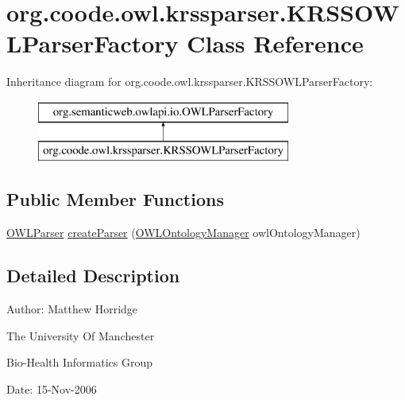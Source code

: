 \hypertarget{classorg_1_1coode_1_1owl_1_1krssparser_1_1_k_r_s_s_o_w_l_parser_factory}{\section{org.\-coode.\-owl.\-krssparser.\-K\-R\-S\-S\-O\-W\-L\-Parser\-Factory Class Reference}
\label{classorg_1_1coode_1_1owl_1_1krssparser_1_1_k_r_s_s_o_w_l_parser_factory}
}
Inheritance diagram for org.\-coode.\-owl.\-krssparser.\-K\-R\-S\-S\-O\-W\-L\-Parser\-Factory\-:\begin{figure}[H]
\begin{center}
\leavevmode
\includegraphics[height=2.000000cm]{classorg_1_1coode_1_1owl_1_1krssparser_1_1_k_r_s_s_o_w_l_parser_factory}
\end{center}
\end{figure}
\subsection*{Public Member Functions}
\begin{DoxyCompactItemize}
\item 
\hyperlink{interfaceorg_1_1semanticweb_1_1owlapi_1_1io_1_1_o_w_l_parser}{O\-W\-L\-Parser} \hyperlink{classorg_1_1coode_1_1owl_1_1krssparser_1_1_k_r_s_s_o_w_l_parser_factory_af5d3b3d95f97034d8264eb87f276a3fd}{create\-Parser} (\hyperlink{interfaceorg_1_1semanticweb_1_1owlapi_1_1model_1_1_o_w_l_ontology_manager}{O\-W\-L\-Ontology\-Manager} owl\-Ontology\-Manager)
\end{DoxyCompactItemize}


\subsection{Detailed Description}
Author\-: Matthew Horridge\par
 The University Of Manchester\par
 Bio-\/\-Health Informatics Group\par
 Date\-: 15-\/\-Nov-\/2006\par
\par
 

